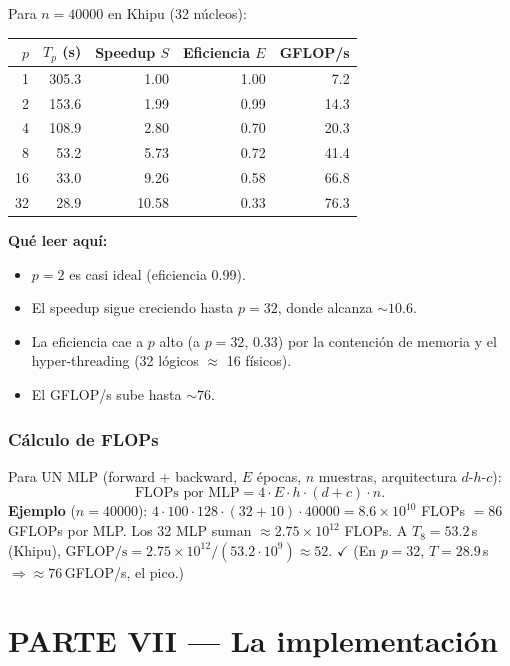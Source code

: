 \documentclass[11pt,a4paper]{article}
\begin{document}
Para $n=40000$ en Khipu (32 núcleos):
\begin{center}
\begin{tabular}{rrrrr}
\toprule
$p$ & $T_p$ (s) & Speedup $S$ & Eficiencia $E$ & GFLOP/s \\\midrule
1 & 305.3 & 1.00 & 1.00 & 7.2 \\
2 & 153.6 & 1.99 & 0.99 & 14.3 \\
4 & 108.9 & 2.80 & 0.70 & 20.3 \\
8 & 53.2 & 5.73 & 0.72 & 41.4 \\
16 & 33.0 & 9.26 & 0.58 & 66.8 \\
32 & 28.9 & 10.58 & 0.33 & 76.3 \\
\bottomrule
\end{tabular}
\end{center}

\textbf{Qué leer aquí:}
\begin{itemize}
  \item $p=2$ es casi ideal (eficiencia 0.99).
  \item El speedup sigue creciendo hasta $p=32$, donde alcanza $\sim 10.6$.
  \item La eficiencia cae a $p$ alto (a $p=32$, 0.33) por la contención de
        memoria y el hyper-threading (32 lógicos $\approx$ 16 físicos).
  \item El GFLOP/s sube hasta $\sim 76$.
\end{itemize}

\section{Cálculo de FLOPs}

Para UN MLP (forward + backward, $E$ épocas, $n$ muestras, arquitectura $d$-$h$-$c$):
\[
\text{FLOPs por MLP} = 4\cdot E\cdot h\cdot(d+c)\cdot n.
\]
\textbf{Ejemplo} ($n=40000$):
$4\cdot 100\cdot 128\cdot(32+10)\cdot 40000 = 8.6\!\times\!10^{10}$ FLOPs $=86$\,GFLOPs por MLP.
Los 32 MLP suman $\approx 2.75\!\times\!10^{12}$ FLOPs. A $T_8=53.2$\,s (Khipu),
$\text{GFLOP/s}=2.75\!\times\!10^{12}/(53.2\cdot 10^9)\approx 52$. $\checkmark$
(En $p=32$, $T=28.9$\,s $\Rightarrow \approx 76$\,GFLOP/s, el pico.)

\part*{PARTE VII --- La implementación}
\end{document}
